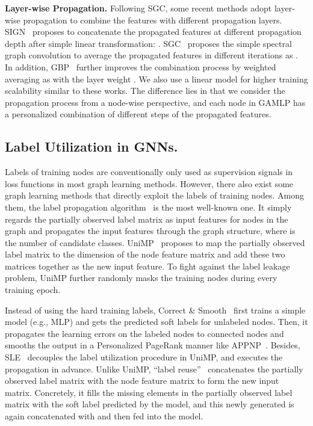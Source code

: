 \documentclass[sigconf]{acmart}
\begin{document}
\noindent\textbf{Layer-wise Propagation.} Following SGC, some recent methods adopt layer-wise propagation to combine the features with different propagation layers. SIGN~\citep{frasca2020sign} proposes to concatenate the propagated features at different propagation depth after simple linear transformation: . SGC~\citep{zhu2021simple} proposes the simple spectral graph convolution to average the propagated features in different iterations as . In addition, GBP~\citep{DBLP:conf/nips/ChenWDL00W20} further improves the combination process by weighted averaging as  with the layer weight .
We also use a linear model for higher training scalability similar to these works. 
The difference lies in that we consider the propagation process from a node-wise perspective, and each node in GAMLP has a personalized combination of different steps of the propagated features.

\subsection{Label Utilization in GNNs.}
Labels of training nodes are conventionally only used as supervision signals in loss functions in most graph learning methods.
However, there also exist some graph learning methods that directly exploit the labels of training nodes.
Among them, the label propagation algorithm~\citep{zhu2002learnin} is the most well-known one.
It simply regards the partially observed label matrix  as input features for nodes in the graph and propagates the input features through the graph structure, where  is the number of candidate classes.
UniMP~\citep{shi2020masked} proposes to map the partially observed label matrix  to the dimension of the node feature matrix  and add these two matrices together as the new input feature.
To fight against the label leakage problem, UniMP further randomly masks the training nodes during every training epoch.

Instead of using the hard training labels, Correct \& Smooth~\citep{huang2020combining} first trains a simple model (e.g., MLP) and gets the predicted soft labels for unlabeled nodes. Then, it propagates the learning errors on the labeled nodes to connected nodes and smooths the output in a Personalized PageRank manner like APPNP~\citep{DBLP:conf/iclr/KlicperaBG19}. 
Besides, SLE~\citep{sun2021scalable} decouples the label utilization procedure in UniMP, and executes the propagation in advance. 
Unlike UniMP, ``label reuse''~\citep{wang2021bag}  concatenates the partially observed label matrix  with the node feature matrix  to form the new input matrix.
Concretely, it fills the missing elements in the partially observed label matrix  with the soft label predicted by the model, and this newly generated  is again concatenated with  and then fed into the model.
\end{document}
